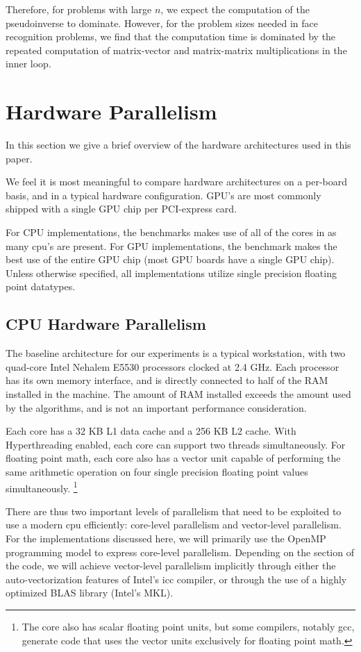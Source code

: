 \documentclass[10pt,twocolumn,letterpaper]{article}
\begin{document}
Therefore, for problems with large $n$, we expect the computation of the
pseudoinverse to dominate.  However, for the problem sizes needed in face
recognition problems, we find that the computation time is dominated by the
repeated computation of matrix-vector and matrix-matrix multiplications in the
inner loop.

\section{Hardware Parallelism} 
In this section we give a brief overview of the hardware architectures used
in this paper.

We feel it is most meaningful to compare hardware architectures on a per-board basis,
and in a typical hardware configuration.  GPU's are most commonly shipped with a single
GPU chip per PCI-express card.  

For CPU implementations, the benchmarks makes use of all of
the cores in as many cpu's are present.  For GPU implementations, the benchmark
makes the best use of the entire GPU chip (most GPU boards have a single GPU
chip).  Unless otherwise specified, all implementations utilize single
precision floating point datatypes.  

\subsection{CPU Hardware Parallelism} 
The baseline architecture for our experiments is a typical workstation,
with two quad-core Intel Nehalem E5530 processors clocked at 2.4 GHz.  Each
processor has its own memory interface, and is directly connected to half of
the RAM installed in the machine.  The amount of RAM installed exceeds the
amount used by the algorithms, and is not an important performance
consideration.  

Each core has a 32 KB L1 data cache and a 256 KB L2 cache. With Hyperthreading
enabled, each core can support two threads simultaneously.  For floating point
math, each core also has a vector unit capable of performing the same
arithmetic operation on four single precision floating point values
simultaneously.  \footnote{The core also has scalar floating point units, but
some compilers, notably gcc, generate code that uses the vector units
exclusively for floating point math.} 

There are thus two important levels of parallelism that need to be exploited to
use a modern cpu efficiently: core-level parallelism and vector-level
parallelism.  For the implementations discussed here, we will primarily use the
OpenMP programming model to express core-level parallelism.  Depending on the
section of the code, we will achieve vector-level parallelism implicitly
through either the auto-vectorization features of Intel's icc compiler, or
through the use of a highly optimized BLAS library (Intel's MKL).
\end{document}

